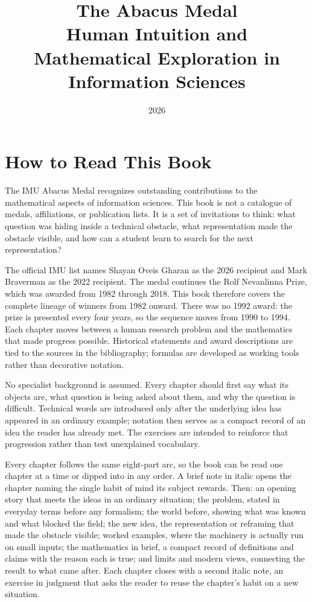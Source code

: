 \documentclass[11pt,oneside]{book}
\title{The Abacus Medal\\[0.4em]\large Human Intuition and Mathematical Exploration in Information Sciences}
\author{}
\date{2026}
\begin{document}
\frontmatter
\maketitle
\chapter*{How to Read This Book}
The IMU Abacus Medal recognizes outstanding contributions to the mathematical aspects of information sciences. This book is not a catalogue of medals, affiliations, or publication lists. It is a set of invitations to think: what question was hiding inside a technical obstacle, what representation made the obstacle visible, and how can a student learn to search for the next representation?

The official IMU list names Shayan Oveis Gharan as the 2026 recipient and Mark Braverman as the 2022 recipient. The medal continues the Rolf Nevanlinna Prize, which was awarded from 1982 through 2018. This book therefore covers the complete lineage of winners from 1982 onward. There was no 1992 award: the prize is presented every four years, so the sequence moves from 1990 to 1994. Each chapter moves between a human research problem and the mathematics that made progress possible. Historical statements and award descriptions are tied to the sources in the bibliography; formulas are developed as working tools rather than decorative notation.

No specialist background is assumed. Every chapter should first say what its objects are, what question is being asked about them, and why the question is difficult. Technical words are introduced only after the underlying idea has appeared in an ordinary example; notation then serves as a compact record of an idea the reader has already met. The exercises are intended to reinforce that progression rather than test unexplained vocabulary.

Every chapter follows the same eight-part arc, so the book can be read one chapter at a time or dipped into in any order. A brief note in italic opens the chapter naming the single habit of mind its subject rewards. Then: an opening story that meets the ideas in an ordinary situation; the problem, stated in everyday terms before any formalism; the world before, showing what was known and what blocked the field; the new idea, the representation or reframing that made the obstacle visible; worked examples, where the machinery is actually run on small inputs; the mathematics in brief, a compact record of definitions and claims with the reason each is true; and limits and modern views, connecting the result to what came after. Each chapter closes with a second italic note, an exercise in judgment that asks the reader to reuse the chapter's habit on a new situation.
\end{document}
